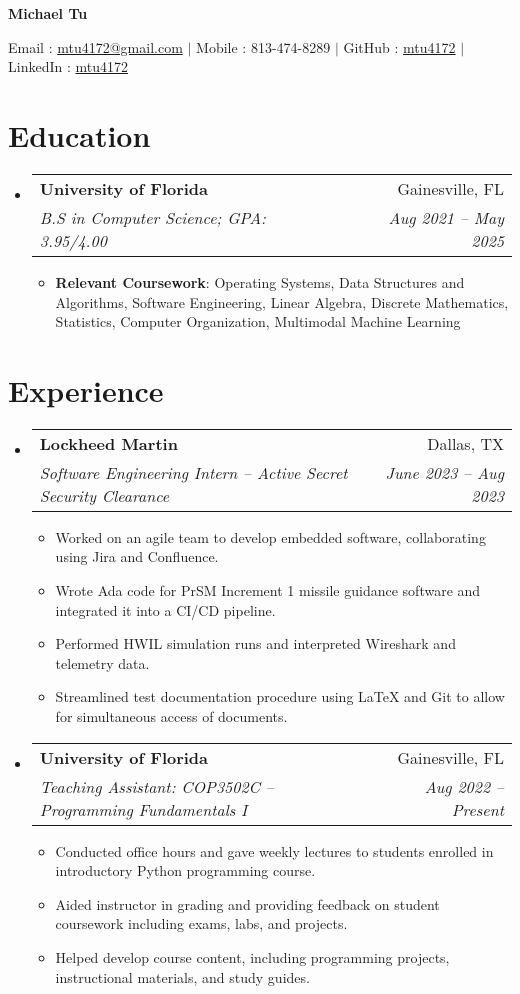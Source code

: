 \documentclass[letterpaper,11pt]{article}
\makeatletter
\newcommand{\resumeItem}[2]{
  \item\small{
    \textbf{#1}{: #2 \vspace{-2pt}}
  }
}
\newcommand{\resumeItemExperience}[1]{
  \item\small{
    {#1 \vspace{-2pt}}
  }
}
\newcommand{\resumeSubheading}[4]{
  \vspace{-1pt}\item
    \begin{tabular*}{0.97\textwidth}{l@{\extracolsep{\fill}}r}
      \textbf{#1} & #2 \\
      \textit{\small#3} & \textit{\small #4} \\
    \end{tabular*}\vspace{-6pt}
}
\newcommand{\resumeSubHeadingListStart}{\begin{itemize}[leftmargin=*, label={}]}
\newcommand{\resumeSubHeadingListEnd}{\end{itemize}}
\newcommand{\resumeItemListStart}{\begin{itemize}}
\newcommand{\resumeItemListEnd}{\end{itemize}\vspace{-5pt}}
\makeatother
\begin{document}
    \centerline{\textbf{\huge Michael Tu}}\vspace{0.15cm}
    \centerline{Email : \href{mailto:}{mtu4172@gmail.com} $|$
    Mobile : 813-474-8289 $|$
    GitHub : \href{http://github.com/mtu4172}{mtu4172} $|$
    LinkedIn : \href{http://linkedin.com/in/mtu4172}{mtu4172}}

\section{Education}
  \resumeSubHeadingListStart
    \resumeSubheading
      {University of Florida}{Gainesville, FL}
      {B.S in Computer Science; GPA: 3.95/4.00}{Aug 2021 -- May 2025}
    \resumeItemListStart
        \resumeItem{Relevant Coursework}
            {Operating Systems,
            Data Structures and Algorithms, 
            Software Engineering, 
            Linear Algebra, 
            Discrete Mathematics, 
            Statistics, 
            Computer Organization,
            Multimodal Machine Learning
            }
    \resumeItemListEnd
  \resumeSubHeadingListEnd

\section{Experience}
  \resumeSubHeadingListStart
    \resumeSubheading
      {Lockheed Martin}{Dallas, TX}
      {Software Engineering Intern -- Active Secret Security Clearance}{June 2023 -- Aug 2023}
      \resumeItemListStart
        \resumeItemExperience
          {Worked on an agile team to develop embedded software, collaborating using Jira and Confluence.}
        \resumeItemExperience
          {Wrote Ada code for PrSM Increment 1 missile guidance software and integrated it into a CI/CD pipeline.}
        \resumeItemExperience
          {Performed HWIL simulation runs and interpreted Wireshark and telemetry data.}
        \resumeItemExperience
          {Streamlined test documentation procedure using LaTeX and Git to allow for simultaneous access of documents.}
        \resumeItemListEnd
    \resumeSubheading
      {University of Florida}{Gainesville, FL}
      {Teaching Assistant: COP3502C -- Programming Fundamentals I}{Aug 2022 -- Present}
      \resumeItemListStart
        \resumeItemExperience
          {Conducted office hours and gave weekly lectures to students enrolled in introductory Python programming course.}
        \resumeItemExperience
          {Aided instructor in grading and providing feedback on student coursework including exams, labs, and projects.}
        \resumeItemExperience
          {Helped develop course content, including programming projects, instructional materials, and study guides.}
        \resumeItemListEnd
  \resumeSubHeadingListEnd
\end{document}
